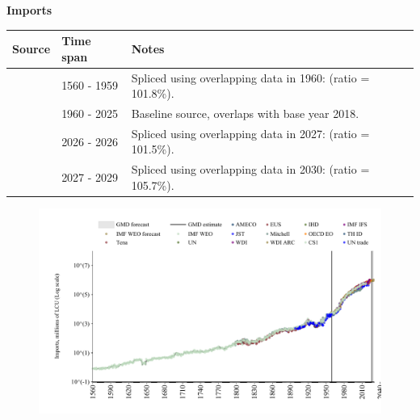 \documentclass[12pt,a4paper,landscape]{article}
\begin{document}
\begin{adjustbox}{max totalsize={\paperwidth}{\paperheight},center}
\begin{minipage}[t][\textheight][t]{\textwidth}
\vspace*{0.5cm}
{}
\begin{center}
{\Large\bfseries Imports}
\end{center}
\vspace{0.5cm}
\begin{table}[H]
\centering
\small
\begin{tabular}{|l|l|l|}
\hline
\textbf{Source} & \textbf{Time span} & \textbf{Notes} \\
\hline
\rowcolor{white}\cite{CS1_GBR}& 1560 - 1959 &Spliced using overlapping data in 1960: (ratio = 101.8\%). \\
\rowcolor{lightgray}\cite{OECD_EO}& 1960 - 2025 &Baseline source, overlaps with base year 2018. \\
\rowcolor{white}\cite{AMECO}& 2026 - 2026 &Spliced using overlapping data in 2027: (ratio = 101.5\%). \\
\rowcolor{lightgray}\cite{IMF_WEO_forecast}& 2027 - 2029 &Spliced using overlapping data in 2030: (ratio = 105.7\%). \\
\hline
\end{tabular}
\end{table}
\begin{figure}[H]
\centering
\includegraphics[width=\textwidth,height=0.6\textheight,keepaspectratio]{graphs/GBR_imports.pdf}
\end{figure}
\end{minipage}
\end{adjustbox}
\end{document}
